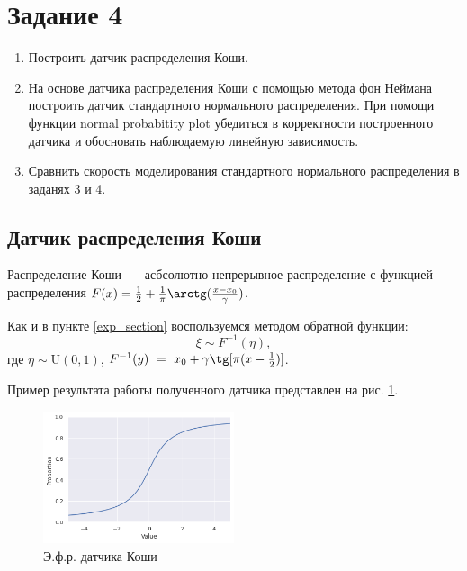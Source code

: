 \section{Задание 4}

\begin{enumerate}
    \item Построить датчик распределения Коши. 
    \item На основе датчика распределения Коши с помощью метода фон Неймана построить датчик стандартного нормального распределения. При помощи функции normal probabitity plot убедиться в корректности построенного датчика и обосновать наблюдаемую линейную зависимость.
    \item Сравнить скорость моделирования стандартного нормального распределения в заданях 3 и 4.
\end{enumerate}

\subsection{Датчик распределения Коши}
    Распределение Коши~--- асбсолютно непрерывное распределение с функцией 
    распределения $F(x) = \frac{1}{2} + 
    \frac{1}{\pi}\arctg(\frac{x-x_0}{\gamma})$.

    Как и в пункте \ref{exp_section} воспользуемся методом 
    обратной функции:
    \begin{equation*}
        \xi \sim F^{-1}(\eta),
    \end{equation*}
    где $\eta \sim \mathrm{U}(0,1)$, 
    $F^{-1}(y)~=~x_0+\gamma\tg[\pi(x-\frac{1}{2})]$.

    Пример результата работы полученного датчика представлен на рис. 
    \ref{cauchy}.

    \begin{figure}[tbp]
        \centering
        \includegraphics[width=0.5\textwidth]{resources/task4_cauchy.png}
        \caption{Э.ф.р. датчика Коши}
        \label{cauchy}
    \end{figure}

